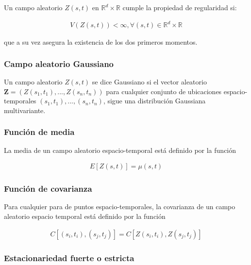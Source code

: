 \documentclass[
]{book}
\begin{document}
Un campo aleatorio \(Z(s,t)\) en \(\mathbb{R}^d\times \mathbb{R}\) cumple la propiedad de regularidad si:

\begin{align}
V(Z(s,t))<\infty, \forall (s,t) \in \mathbb{R}^d\times \mathbb{R}
\end{align}

que a su vez asegura la existencia de los dos primeros momentos.

\hypertarget{campo-aleatorio-gaussiano}{%
\subsubsection*{Campo aleatorio Gaussiano}\label{campo-aleatorio-gaussiano}}

Un campo aleatorio \(Z(s,t)\) se dice Gaussiano si el vector aleatorio \(\textbf{Z}=(Z(s_1,t_1),...,Z(s_n,t_n))\) para cualquier conjunto de ubicaciones espacio-temporales \({(s_1,t_1),...,(s_n,t_n)}\), sigue una distribución Gaussiana multivariante.

\hypertarget{funciuxf3n-de-media-1}{%
\subsubsection*{Función de media}\label{funciuxf3n-de-media-1}}

La media de un campo aleatorio espacio-temporal está definido por la función

\begin{align}
  E[Z(s,t)]=\mu(s,t)
  \end{align}

\hypertarget{funciuxf3n-de-covarianza-1}{%
\subsubsection*{Función de covarianza}\label{funciuxf3n-de-covarianza-1}}

Para cualquier para de puntos espacio-temporales, la covarianza de un campo aleatorio espacio temporal está definido por la función

\begin{align}
C[(s_i,t_i),(s_j,t_j)]=C[Z(s_i,t_i),Z(s_j,t_j)]
\end{align}

\hypertarget{estacionariedad-fuerte-o-estricta}{%
\subsubsection*{Estacionariedad fuerte o estricta}\label{estacionariedad-fuerte-o-estricta}}
\end{document}
